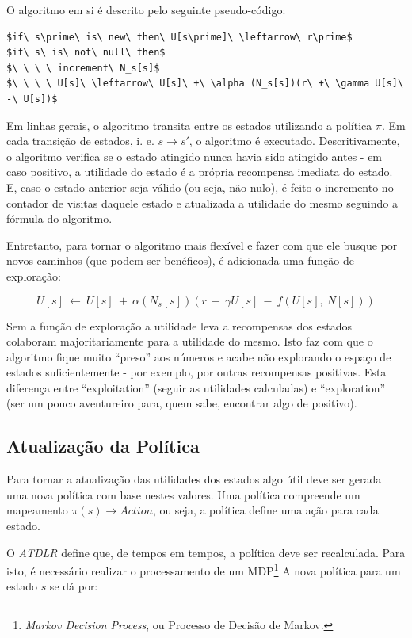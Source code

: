 \documentclass[letterpaper]{article}
\begin{document}
O algoritmo em si é descrito pelo seguinte pseudo-código:

\begin{lstlisting}
$if\ s\prime\ is\ new\ then\ U[s\prime]\ \leftarrow\ r\prime$
$if\ s\ is\ not\ null\ then$
$\ \ \ \ increment\ N_s[s]$
$\ \ \ \ U[s]\ \leftarrow\ U[s]\ +\ \alpha (N_s[s])(r\ +\ \gamma U[s]\ -\ U[s])$
\end{lstlisting}

Em linhas gerais, o algoritmo transita entre os estados utilizando a política $\pi$. Em cada
transição de estados, i. e. $s \rightarrow s\prime$, o algoritmo é executado. Descritivamente,
o algoritmo verifica se o estado atingido nunca havia sido atingido antes - em caso positivo,
a utilidade do estado é a própria recompensa imediata do estado. E, caso o estado anterior seja
válido (ou seja, não nulo), é feito o incremento no contador de visitas daquele estado e
atualizada a utilidade do mesmo seguindo a fórmula do algoritmo.

Entretanto, para tornar o algoritmo mais flexível e fazer com que ele busque por novos caminhos
(que podem ser benéficos), é adicionada uma função de exploração:

\[U[s]\ \leftarrow\ U[s]\ +\ \alpha (N_s[s])(r\ +\ \gamma U[s]\ -\ f(U[s],\ N[s]))\]

Sem a função de exploração a utilidade leva a recompensas dos estados colaboram majoritariamente
para a utilidade do mesmo. Isto faz com que o algoritmo fique muito ``preso'' aos números e acabe
não explorando o espaço de estados suficientemente - por exemplo, por outras recompensas positivas.
Esta diferença entre ``exploitation'' (seguir as utilidades calculadas) e ``exploration'' (ser um
pouco aventureiro para, quem sabe, encontrar algo de positivo).

\subsection{Atualização da Política}

Para tornar a atualização das utilidades dos estados algo útil deve ser gerada uma nova política
com base nestes valores. Uma política compreende um mapeamento $\pi(s) \rightarrow Action$, ou
seja, a política define uma ação para cada estado.

O \textit{ATDLR} define que, de tempos em tempos, a política deve ser recalculada. Para isto, é
necessário realizar o processamento de um MDP\footnote{\textit{Markov Decision Process}, ou
Processo de Decisão de Markov.} A nova política para um estado $s$ se dá por:
\end{document}
